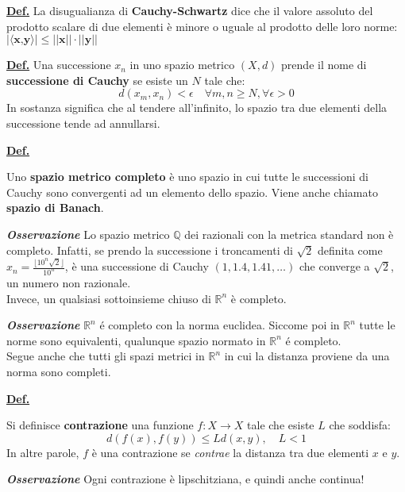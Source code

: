 \documentclass[a4paper,10pt]{article} %
\renewcommand{\b}[1]{%
    {\textbf{#1}}}
\newcommand{\ldef}[1]{%
    {\smallbreak\par\tiny\textbf{\underline{Def.}} {#1} \smallbreak}}
\newcommand{\loss}[1]{%
    {\smallbreak\par\tiny\emph{\textbf{Osservazione}} {#1} \par}}
\begin{document}
\begin{multicols}{6}

\ldef{
    La disugualianza di \b{Cauchy-Schwartz} dice che il valore assoluto del
    prodotto scalare di due elementi \`{e} minore o uguale al prodotto delle
    loro norme:
    $|\langle \b{x,y} \rangle| \leq ||\b{x}|| \cdot ||\b{y}||$
}

\ldef{
    Una successione ${x_n}$ in uno spazio metrico $(X,d)$ prende il nome di \b{successione di Cauchy} se esiste un $N$ tale che:
        $$
        d(x_m, x_n) < \epsilon \quad \forall m,n \geq N, \forall \epsilon > 0
        $$
    In sostanza significa che al tendere all'infinito, lo spazio tra due elementi della successione tende ad annullarsi.
}

\ldef{
    Uno \b{spazio metrico completo} è uno spazio in cui tutte le successioni di Cauchy sono convergenti ad un elemento dello spazio. 
    Viene anche chiamato \b{spazio di Banach}.
    \loss{
        Lo spazio metrico $\mathbb{Q}$ dei razionali con la metrica standard non è completo. Infatti, se prendo la successione i troncamenti di $\sqrt{2}$ definita come $x_n = \frac{\lfloor 10^n \sqrt{2}\rfloor}{10^n}$, è una successione di Cauchy $(1, 1.4, 1.41, \dots)$ che converge a $\sqrt{2}$, un numero non razionale.\\
        Invece, un qualsiasi sottoinsieme chiuso di $\mathbb{R}^n$ è completo.
    }
    \loss{
        $\mathbb{R}^n$ \'{e} completo con la norma euclidea. Siccome poi in $\mathbb{R}^n$ tutte le norme sono equivalenti, qualunque spazio normato in $\mathbb{R}^n$ \'{e} completo. \\
        Segue anche che tutti gli spazi metrici in $\mathbb{R}^n$ in cui la distanza proviene da una norma sono completi.
    }
}


\ldef{
    Si definisce \b{contrazione} una funzione $f : X \rightarrow X$ tale che esiste $L$ che soddisfa:
    $$
    d(f(x), f(y)) \leq Ld(x,y), \quad L < 1
    $$
    In altre parole, $f$ è una contrazione se \emph{contrae} la distanza tra due elementi $x$ e $y$.
    \loss{
        Ogni contrazione è lipschitziana, e quindi anche continua!
    }
}


\end{multicols}
\end{document}
